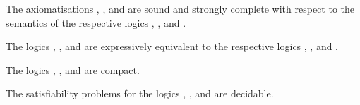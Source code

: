 \begin{proposition}
The axiomatisations \axiomAmlK{}, \axiomAmlKFF{}, and \axiomAmlS{} are sound and strongly complete with respect to the semantics of the respective logics \logicAmlK{}, \logicAmlKFF{}, and \logicAmlS{}.
\end{proposition}

\begin{proposition}
The logics \logicAmlK{}, \logicAmlKFF{}, and \logicAmlS{} are expressively equivalent to the respective logics \logicK{}, \logicKFF{}, and \logicS{}.
\end{proposition}

\begin{proposition}
The logics \logicAmlK{}, \logicAmlKFF{}, and \logicAmlS{} are compact.
\end{proposition}

\begin{proposition}
The satisfiability problems for the logics \logicAmlK{}, \logicAmlKFF{}, and \logicAmlS{} are decidable.
\end{proposition}
